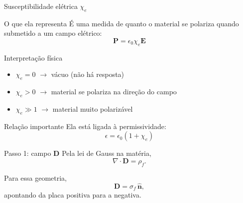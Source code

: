 \documentclass[aspectratio=169]{beamer}
\begin{document}
\begin{frame}{Susceptibilidade elétrica \(\chi_e\)}

\begin{block}{O que ela representa}
É uma medida de quanto o material se polariza quando submetido a um campo elétrico:
\begin{equation}
\mathbf{P} = \epsilon_0 \chi_e \mathbf{E}
\label{eq:susc_def}
\end{equation}
\end{block}

\vspace{0.2cm}

\begin{block}{Interpretação física}
\begin{itemize}
\item \(\chi_e = 0\) \quad $\rightarrow$ vácuo (não há resposta)
\item \(\chi_e > 0\) \quad $\rightarrow$ material se polariza na direção do campo
\item \(\chi_e \gg 1\) \quad $\rightarrow$ material muito polarizável
\end{itemize}
\end{block}

\vspace{0.2cm}

\begin{alertblock}{Relação importante}
Ela está ligada à permissividade:
\begin{equation}
\epsilon = \epsilon_0 (1 + \chi_e)
\label{eq:epsilon_chi}
\end{equation}
\end{alertblock}

\end{frame}

\begin{frame}

\vspace{0.2cm}

\begin{block}{Passo 1: campo \(\mathbf{D}\)}
Pela lei de Gauss na matéria,
\begin{equation}
\nabla\cdot\mathbf{D}=\rho_f.
\end{equation}

Para essa geometria,
\begin{equation}
\mathbf{D}=\sigma_f\,\hat{\mathbf{n}},
\end{equation}
apontando da placa positiva para a negativa.
\end{block}

\end{frame}
\end{document}
